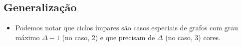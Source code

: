 \documentclass[12pt]{article}
\begin{document}
    \subsection*{Generalização}
    \begin{itemize}
        \item Podemos notar que ciclos ímpares são casos especiais de grafos com grau máximo $\Delta - 1$ (no caso, 2) e que precisam de $\Delta$ (no caso, 3) cores.
    \end{itemize}
\end{document}
